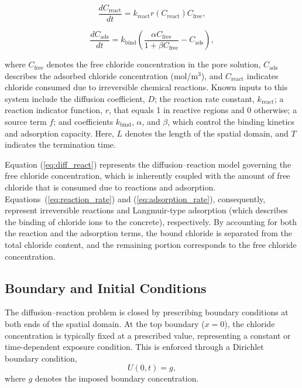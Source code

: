 \documentclass[conference]{IEEEtran}
\begin{document}
\begin{equation}
\frac{dC_{\mathrm{react}}}{dt}
=
k_{\mathrm{react}}
r\left(
C_{\mathrm{react}}
\right)C_{\mathrm{free}},
\label{eq:reaction_rate}
\end{equation}


\begin{equation}
\frac{dC_{\mathrm{ads}}}{dt}
=
k_{\mathrm{bind}}
\left(
\frac{\alpha C_{\mathrm{free}}}{1 + \beta C_{\mathrm{free}}}
-
C_{\mathrm{ads}}
\right),
\label{eq:adsorption_rate}
\end{equation}

where $C_{\mathrm{free}}$ denotes the free chloride concentration in the pore solution, $C_{\mathrm{ads}}$ describes the adsorbed chloride concentration (mol/m$^3$), and $C_{\mathrm{react}}$ indicates chloride consumed due to irreversible chemical reactions.
Known inputs to this system include the diffusion coefficient, $D$; the reaction rate constant, $k_{\mathrm{react}}$; a reaction indicator function, $r$, that equals {1} in reactive regions and {0} otherwise; a source term $f$; and coefficients $k_{\mathrm{bind}}$, $\alpha$, and $\beta$, which control the binding kinetics and adsorption capacity.
Here, $L$ denotes the length of the spatial domain, and $T$ indicates the termination time.

Equation (\ref{eq:diff_react}) represents the diffusion--reaction model governing the free chloride concentration, which is inherently coupled with the amount of free chloride that is consumed due to reactions and adsorption. 
Equations~(\ref{eq:reaction_rate}) and (\ref{eq:adsorption_rate}), consequently, represent irreversible reactions and Langmuir-type adsorption (which describes the binding of chloride ions to the concrete), respectively. 
By accounting for both the reaction and the adsorption terms, the bound chloride is separated from the total chloride content, and the remaining portion corresponds to the free chloride concentration.

\subsection{Boundary and Initial Conditions}

The diffusion--reaction problem is closed by prescribing boundary conditions at both ends of the spatial domain. At the top boundary ($x=0$), the chloride concentration is typically fixed at a prescribed value, representing a constant or time-dependent exposure condition. This is enforced through a Dirichlet boundary condition,
\begin{equation}
U(0,t) = g,
\label{eq:bc_dirichlet}
\end{equation}
where $g$ denotes the imposed boundary concentration.
\end{document}
